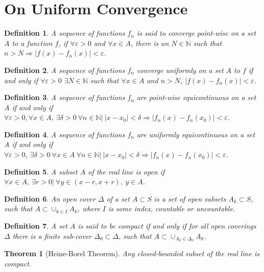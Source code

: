 \documentclass[crop=false,class=book]{standalone}
\theoremstyle{mystyle}
\newtheorem{theorem}{Theorem}[section]
\newtheorem{definition}{Definition}[section]
\begin{document}
\section{On Uniform Convergence}
\begin{definition}
A sequence of functions $f_n$ is said to converge point-wise on a set $A$ to a function $f$, if $\forall\varepsilon>0$ and $\forall x\in A$, there is an $N\in\mathbb{N}$ such that $n>N \Rightarrow |f(x)-f_n(x)|<\varepsilon$.
\end{definition}
\begin{definition}
A sequence of functions $f_n$ converge uniformly on a set $A$ to $f$ if and only if $\forall \varepsilon>0$ $\exists N\in\mathbb{N}$ such that $\forall x \in A$ and $n>N$, $|f(x) -f_n(x)|<\varepsilon$.
\end{definition}
\begin{definition}
A sequence of functions $f_n$ are point-wise equicontinuous on a set $A$ if and only if $\forall \varepsilon>0, \forall x \in A,\ \exists \delta>0\ \forall n\in\mathbb{N}|\ |x-x_0|<\delta \Rightarrow |f_n(x) - f_n(x_0)|<\varepsilon$.
\end{definition}
\begin{definition} A sequence of functions $f_n$ are uniformly equicontinuous on a set A if and only if $\forall\varepsilon>0,\ \exists \delta>0\ \forall x\in A\ \forall n\in\mathbb{N}|\ |x-x_0|<\delta \Rightarrow |f_n(x) - f_n(x_0)|<\varepsilon$.
\end{definition}
\begin{definition} A subset $A$ of the real line is open if $\forall x\in A,\ \exists r>0|\ \forall y \in (x-r,x+r),\ y\in A$.
\end{definition}
\begin{definition}
An open cover $\Delta$ of a set $A\subset S$ is a set of open subsets $A_k\subset S$, such that $A \subset \cup_{k\in I} A_k$, where $I$ is some index, countable or uncountable.
\end{definition}
\begin{definition}
A set $A$ is said to be compact if and only if for all open coverings $\Delta$ there is a finite sub-cover $\Delta_0\subset \Delta$, such that $A\subset \cup_{A_k \in \Delta_0} A_k$.
\end{definition}
\begin{theorem}[Heine-Borel Theorem]
Any closed-bounded subset of the real line is compact. 
\end{theorem}
\end{document}
